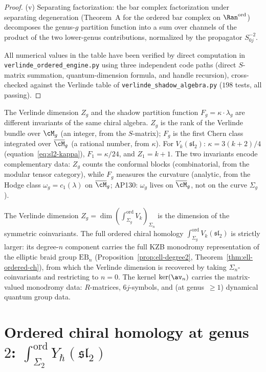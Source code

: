\begin{proof}
\textup{(v)} Separating factorization: the bar complex
factorization under separating degeneration
(Theorem~A for the ordered bar complex on $\Ran^{\mathrm{ord}}$)
decomposes the genus-$g$ partition function into a sum over
channels of the product of the two lower-genus contributions,
normalized by the propagator $S_{0j}^{-2}$.

All numerical values in the table have been verified by
direct computation in
\texttt{verlinde\_ordered\_engine.py}
using three independent code paths
(direct $S$-matrix summation, quantum-dimension formula,
and handle recursion), cross-checked against the Verlinde
table of \texttt{verlinde\_shadow\_algebra.py}
($198$ tests, all passing).
\end{proof}

\begin{remark}
\label{rem:verlinde-vs-shadow}
The Verlinde dimension $Z_g$ and the shadow partition
function $F_g = \kappa \cdot \lambda_g$ are different
invariants of the same chiral algebra. $Z_g$ is the rank of
the Verlinde bundle over $\cM_g$ (an integer, from the
$S$-matrix); $F_g$ is the first Chern class integrated
over $\overline{\cM}_g$ (a rational number, from $\kappa$).
For $V_k(\mathfrak{sl}_2)$:
$\kappa = 3(k{+}2)/4$ (equation~\eqref{eq:sl2-kappa}),
$F_1 = \kappa/24$, and $Z_1 = k + 1$.
The two invariants encode complementary data: $Z_g$ counts
the conformal blocks (combinatorial, from the modular tensor
category), while $F_g$ measures the curvature (analytic,
from the Hodge class $\omega_g = c_1(\lambda)$ on
$\overline{\cM}_g$; AP130: $\omega_g$ lives on
$\overline{\cM}_g$, not on the curve $\Sigma_g$).
\end{remark}

\begin{remark}
\label{rem:verlinde-ordered-refinement}
The Verlinde dimension $Z_g = \dim(\int_{\Sigma_g}^{\mathrm{ord}}
V_k)_{\Sigma_n}$ is the dimension of the symmetric coinvariants.
The full ordered chiral homology
$\int_{\Sigma_g}^{\mathrm{ord}} V_k(\mathfrak{sl}_2)$
is strictly larger: its degree-$n$ component carries the
full KZB monodromy representation of the elliptic braid
group $\mathrm{EB}_n$
(Proposition~\ref{prop:ell-degree2},
Theorem~\ref{thm:ell-ordered-ch}), from which the Verlinde
dimension is recovered by taking $\Sigma_n$-coinvariants
and restricting to $n = 0$. The kernel $\ker(\av_n)$
carries the matrix-valued monodromy data: $R$-matrices,
$6j$-symbols, and (at genus~$\geq 1$) dynamical quantum
group data.
\end{remark}



\section{Ordered chiral homology at genus~$2$:
$\int_{\Sigma_2}^{\mathrm{ord}} Y_\hbar(\mathfrak{sl}_2)$}
